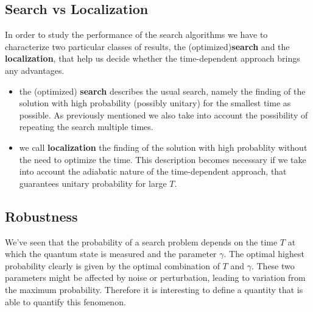     \subsection{Search vs Localization}
      In order to study the performance of the search algorithms we have to characterize two particular classes of results, the (optimized)\textbf{search} and the \textbf{localization}, that help us decide whether the time-dependent approach brings any advantages.
      \begin{itemize}
          \item the (optimized) \textbf{search} describes the usual search, namely the finding of the solution with high probability (possibly unitary) for the smallest time as possible. As previously mentioned we also take into account the possibility of repeating the search multiple times.
          \item we call \textbf{localization} the finding of the solution with high probablity without the need to optimize the time. This description becomes necessary if we take into account the adiabatic nature of the time-dependent approach, that guarantees unitary probability for large $T$.
      \end{itemize}

    \subsection{Robustness}
        We've seen that the probability of a search problem depends on the time $T$ at which the quantum state is measured and the parameter $\gamma$. The optimal highest probability clearly is given by the optimal combination of $T$ and $\gamma$. These two parameters might be affected by noise or perturbation, leading to variation from the maximum probability. Therefore it is interesting to define a quantity that is able to quantify this fenomenon.

